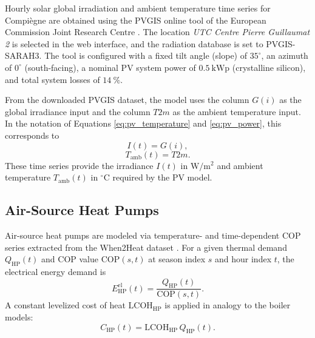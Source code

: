 \documentclass[12pt,a4paper]{report}
\begin{document}
Hourly solar global irradiation and ambient temperature time series for Compi\`egne are obtained using the PVGIS online tool of the European Commission Joint Research Centre \cite{pvgis_sarah3_utc_pg2}. The location \emph{UTC Centre Pierre Guillaumat 2} is selected in the web interface, and the radiation database is set to PVGIS-SARAH3. The tool is configured with a fixed tilt angle (slope) of \(35^\circ\), an azimuth of \(0^\circ\) (south-facing), a nominal PV system power of \(0.5~\mathrm{kWp}\) (crystalline silicon), and total system losses of \(14~\%\).  

From the downloaded PVGIS dataset, the model uses the column \(G(i)\) as the global irradiance input and the column \(T2m\) as the ambient temperature input. In the notation of Equations \ref{eq:pv_temperature} and \ref{eq:pv_power}, this corresponds to
\begin{equation}
I(t) = G(i),
\label{eq:pvgis_irradiance_mapping}
\end{equation}
\begin{equation}
T_{\mathrm{amb}}(t) = T2m.
\label{eq:pvgis_temperature_mapping}
\end{equation}
These time series provide the irradiance \(I(t)\) in \(\mathrm{W/m^2}\) and ambient temperature \(T_{\mathrm{amb}}(t)\) in \({^\circ\mathrm{C}}\) required by the PV model.



\subsection{Air-Source Heat Pumps}
\label{subsec:heat_pumps}

Air-source heat pumps are modeled via temperature- and time-dependent COP series extracted from the When2Heat dataset \cite{ruhnau_when2heat_2019}. For a given thermal demand \(Q_{\mathrm{HP}}(t)\) and COP value \(\mathrm{COP}(s,t)\) at season index \(s\) and hour index \(t\), the electrical energy demand is
\begin{equation}
E_{\mathrm{HP}}^{\mathrm{el}}(t) = \frac{Q_{\mathrm{HP}}(t)}{\mathrm{COP}(s,t)}.
\label{eq:heat_pump_power}
\end{equation}
A constant levelized cost of heat \(\mathrm{LCOH}_{\mathrm{HP}}\) is applied in analogy to the boiler models:
\begin{equation}
C_{\mathrm{HP}}(t) = \mathrm{LCOH}_{\mathrm{HP}}\,Q_{\mathrm{HP}}(t).
\label{eq:heat_pump_cost}
\end{equation}
\end{document}
